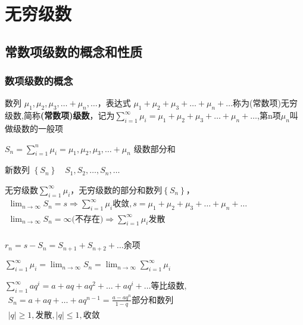 \documentclass[UTF8]{ctexart}
\newcommand{\mt}[1]{\text{#1}}
\newcommand{\mb}[1]{\textbf{#1}}
\newcommand{\md}[1]{\displaystyle{#1}}
\newcommand{\mda}[1]{$\displaystyle{ #1 }$}
\newcommand{\mf}[1]{\left( #1\right)}
\newcommand{\mfa}[1]{\left| #1\right|}
\newcommand{\mfb}[1]{\left\{ #1\right\}}
\newcommand{\q}{\quad}
\newcommand{\mh}[2]{\overset{#2}{#1}}
\newcommand{\ma}[1]{\begin{array}{llll} #1 \end{array}}
\newcommand{\tpa}[1]{
    \begin{center}
        \begin{tikzpicture}  
        
            #1 
            \end{tikzpicture}
    \end{center}
}
\newcommand{\da}[2]{\frac{\partial #1}{\partial #2}}
\newcommand{\hls}[1] {
    \left|
        \begin{array}{llll} #1 \end{array}
    \right|
}
\begin{document}




\setcounter{section}{11}
\newpage

\section{无穷级数}

\subsection{常数项级数的概念和性质}

\subsubsection{数项级数的概念}

数列 $\mu_1,\mu_2,\mu_3,\dots+\mu_n,\dots$，表达式 $\mu_1+\mu_2+\mu_3+\dots+\mu_n+\dots$称为(常数项)无穷级数,简称\mb{(常数项)级数}，记为$\sum_{i=1}^\infty\mu_i=
\mu_1+\mu_2+\mu_3+\dots+\mu_n+\dots$,第n项$\mu_n$叫做级数的一般项


$S_n=\sum_{i=1}^n\mu_i=\mu_1,\mu_2,\mu_3,\dots+\mu_n$ 级数部分和

新数列 $\mfb{S_n} \q S_1,S_2,\dots,S_n,\dots$


\noindent
无穷级数$\sum_{i=1}^\infty\mu_i$，无穷级数的部分和数列$\mfb{S_n}$，$\ma{
    \lim_{n \rightarrow \infty} S_n=s \Rightarrow \sum_{i=1}^\infty\mu_i \mt{收敛},s=\mu_1+\mu_2+\mu_3+\dots+\mu_n+\dots\\
    \lim_{n \rightarrow \infty} S_n=\infty \mt{(不存在)} \Rightarrow \sum_{i=1}^\infty\mu_i \mt{发散}\\
}$

    
$r_n=s-S_n=S_{n+1}+S_{n+2}+\dots$余项

$\md{\sum_{i=1}^\infty \mu_i=\lim_{n \rightarrow \infty}S_n=\lim_{n \rightarrow \infty}\sum_{i=1}^\infty \mu_i}$

\mda{\sum_{i=1}^\infty aq^i=a+aq+aq^2+\dots+aq^i+\dots}等比级数,\mda{\ma{S_n=a+aq+\dots+aq^{n-1}=\frac{a-aq^n}{1-q}\mt{部分和数列}\\
\mfa{q}\geqslant 1,\mt{发散},\mfa{q}\leqslant 1,\mt{收敛}
}}
\end{document}

